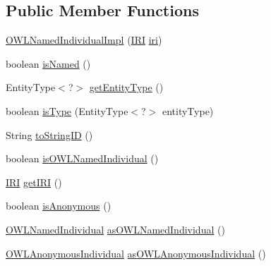 \subsection*{Public Member Functions}
\begin{DoxyCompactItemize}
\item 
\hyperlink{classuk_1_1ac_1_1manchester_1_1cs_1_1owl_1_1owlapi_1_1_o_w_l_named_individual_impl_a60a732d163662d28d531ecd4d4b4106e}{O\-W\-L\-Named\-Individual\-Impl} (\hyperlink{classorg_1_1semanticweb_1_1owlapi_1_1model_1_1_i_r_i}{I\-R\-I} \hyperlink{classuk_1_1ac_1_1manchester_1_1cs_1_1owl_1_1owlapi_1_1_o_w_l_named_individual_impl_a8b3dad50b45ec458da0e500409882f84}{iri})
\item 
boolean \hyperlink{classuk_1_1ac_1_1manchester_1_1cs_1_1owl_1_1owlapi_1_1_o_w_l_named_individual_impl_a6393705addefafe510fef75b044aaf26}{is\-Named} ()
\item 
Entity\-Type$<$?$>$ \hyperlink{classuk_1_1ac_1_1manchester_1_1cs_1_1owl_1_1owlapi_1_1_o_w_l_named_individual_impl_a18d67aa847671071ad29e66c527ac578}{get\-Entity\-Type} ()
\item 
boolean \hyperlink{classuk_1_1ac_1_1manchester_1_1cs_1_1owl_1_1owlapi_1_1_o_w_l_named_individual_impl_a6ffbceb1a3c4ee653db3db6cae28a48d}{is\-Type} (Entity\-Type$<$?$>$ entity\-Type)
\item 
String \hyperlink{classuk_1_1ac_1_1manchester_1_1cs_1_1owl_1_1owlapi_1_1_o_w_l_named_individual_impl_aac3ff3faf0e4f167a2edf2f39b1fa406}{to\-String\-I\-D} ()
\item 
boolean \hyperlink{classuk_1_1ac_1_1manchester_1_1cs_1_1owl_1_1owlapi_1_1_o_w_l_named_individual_impl_a34f691737d569db8eb3f32b483cf623c}{is\-O\-W\-L\-Named\-Individual} ()
\item 
\hyperlink{classorg_1_1semanticweb_1_1owlapi_1_1model_1_1_i_r_i}{I\-R\-I} \hyperlink{classuk_1_1ac_1_1manchester_1_1cs_1_1owl_1_1owlapi_1_1_o_w_l_named_individual_impl_acd715983f008de2754833d7945220b0d}{get\-I\-R\-I} ()
\item 
boolean \hyperlink{classuk_1_1ac_1_1manchester_1_1cs_1_1owl_1_1owlapi_1_1_o_w_l_named_individual_impl_acce286548445af5cec36b8e89c170c94}{is\-Anonymous} ()
\item 
\hyperlink{interfaceorg_1_1semanticweb_1_1owlapi_1_1model_1_1_o_w_l_named_individual}{O\-W\-L\-Named\-Individual} \hyperlink{classuk_1_1ac_1_1manchester_1_1cs_1_1owl_1_1owlapi_1_1_o_w_l_named_individual_impl_acd40c715b341dd04240d3d2f3df62e52}{as\-O\-W\-L\-Named\-Individual} ()
\item 
\hyperlink{interfaceorg_1_1semanticweb_1_1owlapi_1_1model_1_1_o_w_l_anonymous_individual}{O\-W\-L\-Anonymous\-Individual} \hyperlink{classuk_1_1ac_1_1manchester_1_1cs_1_1owl_1_1owlapi_1_1_o_w_l_named_individual_impl_a666546e56008bf14083c0e4ed0b46dae}{as\-O\-W\-L\-Anonymous\-Individual} ()

\end{DoxyCompactItemize}
